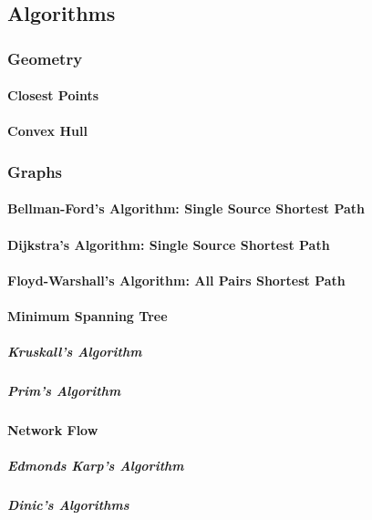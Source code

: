 \documentclass[letterpaper,11pt,twoside]{article}
\newcommand{\PartDivider}[1] {
    \clearpage
    \thispagestyle{empty}
    \vspace*{\stretch{2}}
    \begin{center}
        \part{#1}
    \end{center}
    \vspace*{\stretch{4}}
    \clearpage
}
\begin{document}
    \PartDivider{Algorithms}
        \section{Geometry}
            \subsection{Closest Points}
            \subsection{Convex Hull}

        \section{Graphs}
            \subsection{Bellman-Ford's Algorithm: Single Source Shortest Path}
            \subsection{Dijkstra's Algorithm: Single Source Shortest Path}
            \subsection{Floyd-Warshall's Algorithm: All Pairs Shortest Path}
            \subsection{Minimum Spanning Tree}
                \subsubsection{Kruskall's Algorithm}
                \subsubsection{Prim's Algorithm}
            \subsection{Network Flow}
                \subsubsection{Edmonds Karp's Algorithm}
                \subsubsection{Dinic's Algorithms}
\end{document}
